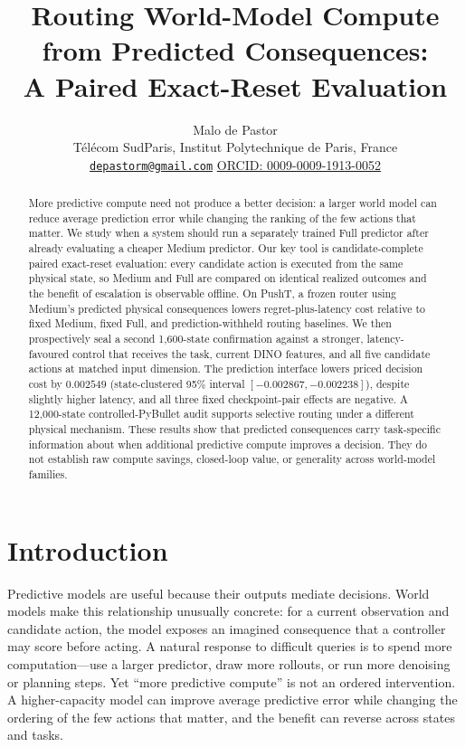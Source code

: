 \documentclass[10pt]{article}
\title{Routing World-Model Compute from Predicted Consequences:\\
A Paired Exact-Reset Evaluation}
\author{Malo de Pastor\\
\small Télécom SudParis, Institut Polytechnique de Paris, France\\
\small \href{mailto:depastorm@gmail.com}{\texttt{depastorm@gmail.com}}
\quad
\href{https://orcid.org/0009-0009-1913-0052}{ORCID: 0009-0009-1913-0052}}
\date{}
\theoremstyle{definition}
\theoremstyle{remark}
\begin{document}
\maketitle

\begin{abstract}
More predictive compute need not produce a better decision: a larger world
model can reduce average prediction error while changing the ranking of the
few actions that matter.  We study when a system should run a separately
trained Full predictor after already evaluating a cheaper Medium predictor.
Our key tool is candidate-complete paired exact-reset evaluation: every
candidate action is executed from the same physical state, so Medium and Full
are compared on identical realized outcomes and the benefit of escalation is
observable offline.  On PushT, a frozen router using Medium's predicted
physical consequences lowers regret-plus-latency cost relative to fixed
Medium, fixed Full, and prediction-withheld routing baselines.  We then
prospectively seal a second 1,600-state confirmation against a stronger,
latency-favoured control that receives the task, current DINO features, and all
five candidate actions at matched input dimension.  The prediction interface
lowers priced decision cost by $0.002549$ (state-clustered 95\% interval
$[-0.002867,-0.002238]$), despite slightly higher latency, and all three fixed
checkpoint-pair effects are negative.  A 12,000-state controlled-PyBullet audit
supports selective routing under a different physical mechanism.  These
results show that predicted consequences carry task-specific information about
when additional predictive compute improves a decision.  They do not establish
raw compute savings, closed-loop value, or generality across world-model
families.
\end{abstract}

\section{Introduction}

Predictive models are useful because their outputs mediate decisions.
World models make this relationship unusually concrete: for a current
observation and candidate action, the model exposes an imagined consequence
that a controller may score before acting.  A natural response to difficult
queries is to spend more computation---use a larger predictor, draw more
rollouts, or run more denoising or planning steps.  Yet ``more predictive
compute'' is not an ordered intervention.  A higher-capacity model can improve
average predictive error while changing the ordering of the few actions that
matter, and the benefit can reverse across states and tasks.
\end{document}
